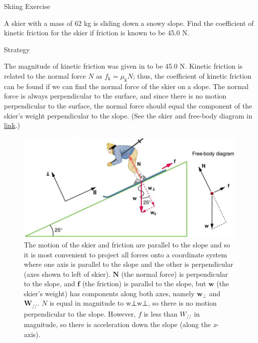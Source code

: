 \documentclass[
]{book}
\newenvironment{tinysection}{}{}
\begin{document}
\hypertarget{fs-id1704828}{}
Skiing Exercise

A skier with a mass of 62 kg is sliding down a snowy slope. Find the
coefficient of kinetic friction for the skier if friction is known to be
45.0 N.

\begin{tinysection}

{Strategy}

\end{tinysection}

The magnitude of kinetic friction was given in to be 45.0 N. Kinetic
friction is related to the normal force \(N{}\) as
\({{f_{\text{k}} = \mu_{\text{k}}}N}{}\); thus, the coefficient of kinetic
friction can be found if we can find the normal force of the skier on a
slope. The normal force is always perpendicular to the surface, and
since there is no motion perpendicular to the surface, the normal force
should equal the component of the skier's weight perpendicular to the
slope. (See the skier and free-body diagram in
\protect\hyperlink{import-auto-id1165296217411}{link}.)

\begin{figure}
\hypertarget{import-auto-id1165296217411}{%
\centering
\includegraphics{images/Figure_06_01_03a.jpg}
\caption{The motion of the skier and friction are parallel to the slope and so
it is most convenient to project all forces onto a coordinate system
where one axis is parallel to the slope and the other is perpendicular
(axes shown to left of skier). \(\textbf{N}\) (the normal force) is
perpendicular to the slope, and \(\textbf{f}\) (the friction) is parallel
to the slope, but \(\textbf{w}\) (the skier's weight) has components
along both axes, namely \(\textbf{w}_{\text{⊥}}{}\) and
\(\textbf{W}_{//}{}\). \(N{}\) is equal in magnitude to {w⊥w⊥}, so there
is no motion perpendicular to the slope. However, \(f{}\) is less than
\(W_{\text{//}}{}\) in magnitude, so there is acceleration down the slope
(along the
\emph{x}-axis).}\label{import-auto-id1165296217411}
}
\end{figure}
\end{document}
